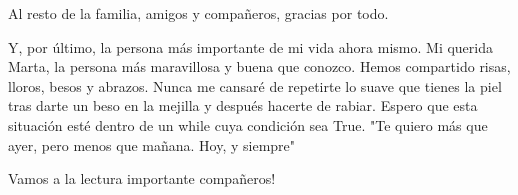 Al resto de la familia, amigos y compañeros, gracias por todo.

Y, por último, la persona más importante de mi vida ahora mismo. Mi querida Marta, la persona más maravillosa y buena que conozco. Hemos compartido risas, lloros, besos y abrazos. Nunca me cansaré de repetirte lo suave que tienes la piel tras darte un beso en la mejilla y después hacerte de rabiar. Espero que esta situación esté dentro de un while cuya condición sea True.
"Te quiero más que ayer, pero menos que mañana. Hoy, y siempre"

Vamos a la lectura importante compañeros!


